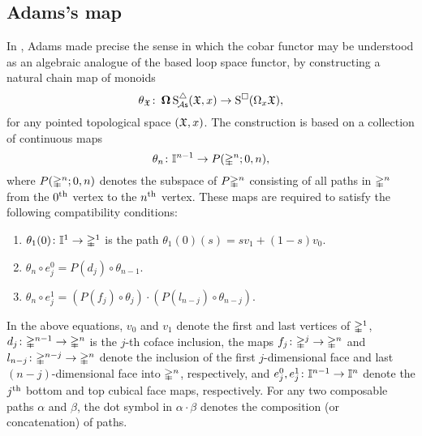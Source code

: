 
\subsection{Adams's map}\label{ss:adams maps}

In \cite{adams1956cobar}, Adams made precise the sense in which the cobar functor may be understood as an algebraic analogue of the based loop space functor, by constructing a natural chain map of monoids
\begin{equation}\label{e:adams map 2}
	\theta_{\mathfrak{X}} \colon \operatorname{\mathbf{\Omega}} \operatorname{S^{\triangle}_{\!{\mathcal{A}\mathsf{s}}}}(\mathfrak{X},x) \to \operatorname{S^{\square}}(\Omega_x \mathfrak{X}),
\end{equation}
for any pointed topological space $(\mathfrak{X},x)$.
The construction is based on a collection of continuous maps
\[
\theta_n \colon \mathbb{I}^{n-1} \to P(\mathbb{\Delta}^n;0,n),
\]
where $P(\mathbb{\Delta}^n;0,n)$ denotes the subspace of $P \mathbb{\Delta}^n$ consisting of all paths in $\mathbb{\Delta}^n$ from the $0^{\mathrm{th}}$ vertex to the $n^{\mathrm{th}}$ vertex. These maps are required to satisfy the following compatibility conditions:
\begin{enumerate}
	\item $\theta_1(0)\colon \mathbb{I}^1 \to \mathbb{\Delta}^1$ is the path $\theta_1(0)(s) = sv_1 +(1-s)v_0$.
	\item $\theta_n \circ e_j^0 = P(d_j) \circ \theta_{n-1}$.
	\item $\theta_n \circ e_j^1 = (P(f_j) \circ \theta_j) \cdot (P(l_{n-j}) \circ \theta_{n-j})$.
\end{enumerate}
In the above equations, $v_0$ and $v_1$ denote the first and last vertices of $\mathbb{\Delta}^1$, $d_j \colon \mathbb{\Delta}^{n-1} \to \mathbb{\Delta}^n$ is the $j$-th coface inclusion, the maps $f_j\colon \mathbb{\Delta}^j \rightarrow \mathbb{\Delta}^n$ and $l_{n-j}\colon \mathbb{\Delta}^{n-j} \rightarrow \mathbb{\Delta}^n$ denote the inclusion of the first $j$-dimensional face and last $(n-j)$-dimensional face into $\mathbb{\Delta}^n$, respectively, and
$e_j^0,e_j^1\colon \mathbb{I}^{n-1} \rightarrow \mathbb{I}^{n}$ denote the $j^{\mathrm{th}}$ bottom and top cubical face maps, respectively.
For any two composable paths $\alpha$ and $\beta$, the dot symbol in $\alpha \cdot \beta$ denotes the composition (or concatenation) of paths.

